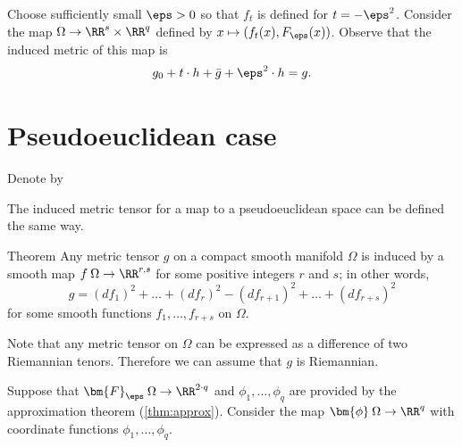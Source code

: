 Choose sufficiently small $\eps>0$ so that $f_t$ is defined for $t=-\eps^2$.
Consider the map $\Omega \to \RR^s\times\RR^q$ defined by 
$x\mapsto (f_t(x),F_\eps(x))$.
Observe that the induced metric of this map is
\[g_0+t\cdot h+\bar g+\eps^2\cdot h=g.\]
\qedsf

















































\section{Pseudoeuclidean case}

Denote by 

The induced metric tensor for a map to a pseudoeuclidean space can be defined the same way.

\begin{thm}{Theorem}
Any metric tensor $g$ on a compact smooth manifold $\Omega$ is induced by a smooth map $f\:\Omega \to \RR^{r,s}$ for some positive integers $r$ and $s$;
in other words, 
\[g=(df_1)^2+\dots+(df_r)^2-(df_{r+1})^2+\dots+(df_{r+s})^2\]
for some smooth functions $f_1,\dots,f_{r+s}$ on $\Omega$.
\end{thm}

Note that any metric tensor on $\Omega$ can be expressed as a difference of two Riemannian tenors.
Therefore we can assume that $g$ is Riemannian.

Suppose that $\bm{F}_\eps\:\Omega \to \RR^{2\cdot q}$ and $\phi_1,\dots,\phi_{q}$ are provided by the approximation theorem (\ref{thm:approx}).
Consider the map $\bm{\phi}\:\Omega \to \RR^q$  with coordinate functions $\phi_1,\dots,\phi_q$.

